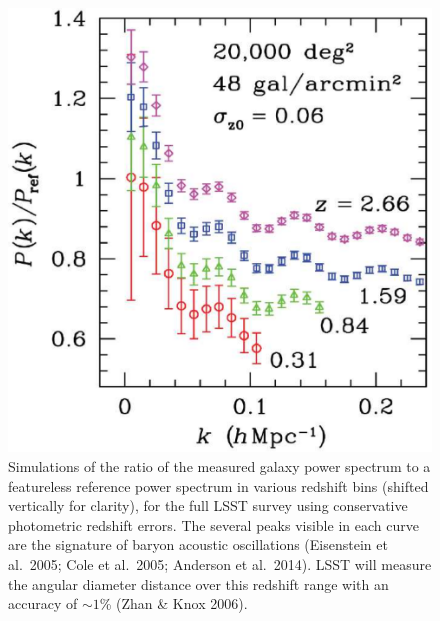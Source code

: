 \documentclass{emulateapj}
\begin{document}
\begin{figure}
\includegraphics[width=1.0\hsize,clip]{bao.pdf}
\caption{Simulations of the ratio of the measured galaxy power spectrum to 
a featureless reference power spectrum in various redshift bins (shifted vertically 
for clarity), for the full LSST survey using conservative photometric redshift
errors. The several peaks visible in each curve are the signature of baryon acoustic 
oscillations (Eisenstein et al.~2005; Cole et al.~2005; Anderson et al.~2014). LSST will measure the 
angular diameter distance over this redshift range with an accuracy of $\sim1$\% 
(Zhan \& Knox 2006).} 
\label{Fig:bao}
\end{figure}
\end{document}
